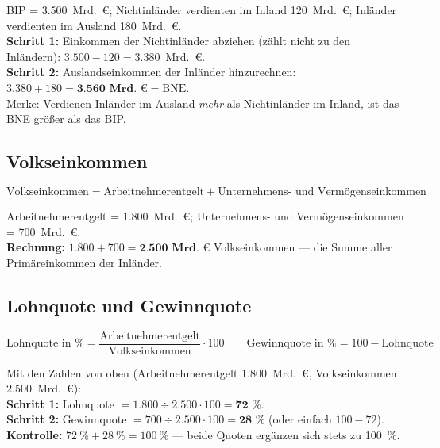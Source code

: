 \documentclass[11pt, a4paper]{article}
\begin{document}
\begin{beispiel}
BIP = 3.500~Mrd.~€; Nichtinländer verdienten im Inland 120~Mrd.~€; Inländer verdienten
im Ausland 180~Mrd.~€.\\[0.3em]
\textbf{Schritt 1:} Einkommen der Nichtinländer abziehen (zählt nicht zu den Inländern):
$3.500 - 120 = 3.380$~Mrd.~€.\\
\textbf{Schritt 2:} Auslandseinkommen der Inländer hinzurechnen:
$3.380 + 180 = \textbf{3.560~Mrd.~€} = \text{BNE}$.\\[0.3em]
Merke: Verdienen Inländer im Ausland \emph{mehr} als Nichtinländer im Inland, ist das
BNE größer als das BIP.
\end{beispiel}

\subsection{Volkseinkommen}

\begin{merksatz}[title={\bfseries Formel: Volkseinkommen}]
\[
\text{Volkseinkommen} = \text{Arbeitnehmerentgelt}
+ \text{Unternehmens- und Vermögenseinkommen}
\]
\end{merksatz}

\begin{beispiel}
Arbeitnehmerentgelt = 1.800~Mrd.~€; Unternehmens- und Vermögenseinkommen = 700~Mrd.~€.\\
\textbf{Rechnung:} $1.800 + 700 = \textbf{2.500~Mrd.~€}$ Volkseinkommen ---
die Summe aller Primäreinkommen der Inländer.
\end{beispiel}

\subsection{Lohnquote und Gewinnquote}

\begin{merksatz}[title={\bfseries Formeln: Lohnquote und Gewinnquote}]
\[
\text{Lohnquote in \%} = \frac{\text{Arbeitnehmerentgelt}}{\text{Volkseinkommen}} \cdot 100
\qquad
\text{Gewinnquote in \%} = 100 - \text{Lohnquote}
\]
\end{merksatz}

\begin{beispiel}
Mit den Zahlen von oben (Arbeitnehmerentgelt 1.800~Mrd.~€, Volkseinkommen
2.500~Mrd.~€):\\[0.3em]
\textbf{Schritt 1:} Lohnquote $= 1.800 \div 2.500 \cdot 100 = \textbf{72~\%}$.\\
\textbf{Schritt 2:} Gewinnquote $= 700 \div 2.500 \cdot 100 = \textbf{28~\%}$
(oder einfach $100 - 72$).\\
\textbf{Kontrolle:} $72~\% + 28~\% = 100~\%$ --- beide Quoten ergänzen sich stets zu 100~\%.
\end{beispiel}
\end{document}
